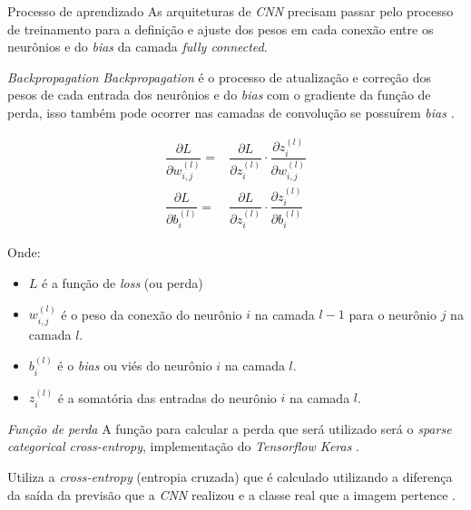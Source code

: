 \begin{frame}{Processo de aprendizado}
    As arquiteturas de \textit{CNN} precisam passar pelo processo de treinamento para a definição e ajuste dos pesos em cada conexão entre os neurônios e do \textit{bias} da camada \textit{fully connected}. 
\end{frame}

\begin{frame}{\textit{Backpropagation}}
\textit{Backpropagation} é o processo de atualização e correção dos pesos de cada entrada dos neurônios e do \textit{bias} com o gradiente da função de perda, isso também pode ocorrer nas camadas de convolução se possuírem \textit {bias} \cite{computers12080151}.

\end{frame}

\begin{frame}[plain]
    \begin{align}
        \dfrac{\partial L}{\partial w^{(l)}_{i,j}}=&\dfrac{\partial L}{\partial z_{i}^{(l)}}\cdot\dfrac{\partial z_{i}^{(l)}}{\partial w_{i,j}^{(l)}}\\
        \dfrac{\partial L}{\partial b_{i}^{(l)}}=&\dfrac{\partial L}{\partial z_{i}^{(l)}}\cdot\dfrac{\partial z_{i}^{(l)}}{\partial b_{i}^{(l)}}
\end{align}

Onde:

\begin{itemize}
    \item $L$ é a função de \textit{loss} (ou perda)
    \item $w_{i,j}^{(l)}$ é o peso da conexão do neurônio $i$ na camada $l-1$ para o neurônio $j$ na camada $l$.
    \item $b_{i}^{(l)}$ é o \textit{bias} ou viés do neurônio $i$ na camada $l$.
    \item $z_{i}^{(l)}$ é a somatória das entradas do neurônio $i$ na camada $l$.
\end{itemize}
\end{frame}

\begin{frame}{\textit{Função de perda}}
    A função para calcular a perda que será utilizado será o \textit{sparse categorical cross-entropy}, implementação do \textit{Tensorflow Keras} \cite{chollet2015keras}.

    \vspace{1em}
    Utiliza a \textit{cross-entropy} (entropia cruzada) que é calculado utilizando a diferença da saída da previsão que a \textit{CNN} realizou e a classe real que a imagem pertence \cite{paszke2019pytorchimperativestylehighperformance}.
\end{frame}

